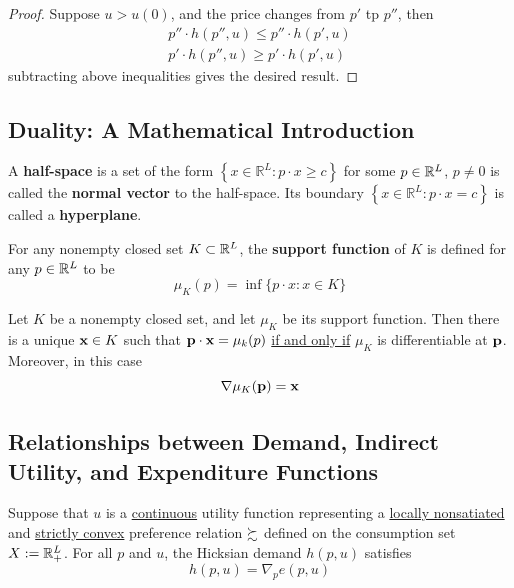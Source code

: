 \documentclass{article}
\begin{document}
 			\begin{proof}
 				Suppose $u > u(0)$, and the price changes from $p'$ tp $p''$, then
 				\begin{align}
 					p'' \cdot h(p'', u) \leq p'' \cdot h(p', u) \\
 					p' \cdot h(p'', u) \geq p' \cdot h(p', u)
 				\end{align}
 				subtracting above inequalities gives the desired result.
 			\end{proof}
 			
 		\subsection{Duality: A Mathematical Introduction}
 			\begin{definition}
 				A \textbf{half-space} is a set of the form $\left\{x \in \mathbb{R}^{L} : p \cdot x \geq c\right\}$ for some $p \in \mathbb{R}^L$, $p \neq 0$ is called the \textbf{normal vector} to the half-space. Its boundary $\left\{x \in \mathbb{R}^{L} : p \cdot x = c\right\}$ is called a \textbf{hyperplane}.
 			\end{definition}
 		
 			\begin{definition}[3.F.1]
 				For any nonempty closed set $K \subset \mathbb{R}^L$, the \textbf{support function} of $K$ is defined for any $p \in \mathbb{R}^L$ to be 
 				\begin{equation}
 					\mu_{K}(p)=\inf \{p \cdot x : x \in K\}
 				\end{equation}
 			\end{definition}
 				
 			\begin{proposition}
 				Let $K$ be a nonempty closed set, and let $\mu_K$ be its support function. Then there is a unique $\textbf{x} \in K$ such that $\textbf{p} \cdot \textbf{x} = \mu_k(p)$ \ul{if and only if} $\mu_K$ is differentiable at $\textbf{p}$. Moreover, in this case
 				\begin{equation}
 					\nabla \mu_K(\textbf{p}) = \textbf{x}
 				\end{equation}
 			\end{proposition}
 			
 		\subsection{Relationships between Demand, Indirect Utility, and Expenditure Functions}
 			\begin{proposition}
 				Suppose that $u$ is a \ul{continuous} utility function representing a \ul{locally nonsatiated} and \ul{strictly convex} preference relation $\succsim$ defined on the consumption set $X := \mathbb{R}^L_+$. For all $p$ and $u$, the Hicksian demand $h(p, u)$ satisfies
 				\begin{equation}
 					h(p, u)=\nabla_{p} e(p, u)
 				\end{equation}
 			\end{proposition}
 			
\end{document}
